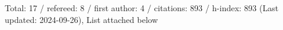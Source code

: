 Total: 17 / refereed: 8 / first author: 4 / citations: 893 / h-index: 893 (Last updated: 2024-09-26), List attached below